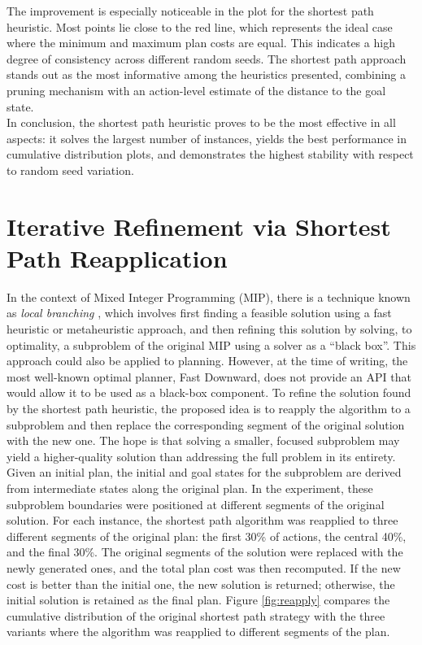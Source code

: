 The improvement is especially noticeable in the plot for the shortest path heuristic. Most points lie close to the red line,
which represents the ideal case where the minimum and maximum plan costs are equal. This indicates a high degree of consistency
across different random seeds. The shortest path approach stands out as the most informative among the heuristics presented,
combining a pruning mechanism with an action-level estimate of the distance to the goal state.\\
In conclusion, the shortest path heuristic proves to be the most effective in all aspects: it solves the largest number of instances,
yields the best performance in cumulative distribution plots, and demonstrates the highest stability with respect to random seed variation.

\section{Iterative Refinement via Shortest Path Reapplication}
In the context of Mixed Integer Programming (MIP), there is a technique known as \textit{local branching} \cite{fischetti2003local},
which involves first finding a feasible solution using a fast heuristic or metaheuristic approach, and then refining this solution by solving,
to optimality, a subproblem of the original MIP using a solver as a ``black box''.
This approach could also be applied to planning. However, at the time of writing, the most well-known optimal planner, Fast Downward,
does not provide an API that would allow it to be used as a black-box component. To refine the solution found by the shortest path heuristic,
the proposed idea is to reapply the algorithm to a subproblem and then replace the corresponding segment of the original solution with the new one.
The hope is that solving a smaller, focused subproblem may yield a higher-quality solution than addressing the full problem in its entirety.
Given an initial plan, the initial and goal states for the subproblem are derived from intermediate states along the original plan.
In the experiment, these subproblem boundaries were positioned at different segments of the original solution.
For each instance, the shortest path algorithm was reapplied to three different segments of the original plan: the first 30\% of actions,
the central 40\%, and the final 30\%.
The original segments of the solution were replaced with the newly generated ones, and the total plan cost was then recomputed.
If the new cost is better than the initial one, the new solution is returned; otherwise, the initial solution is retained as the final plan.
Figure \ref{fig:reapply} compares the cumulative distribution of the original shortest path
strategy with the three variants where the algorithm was reapplied to different segments of the plan.

